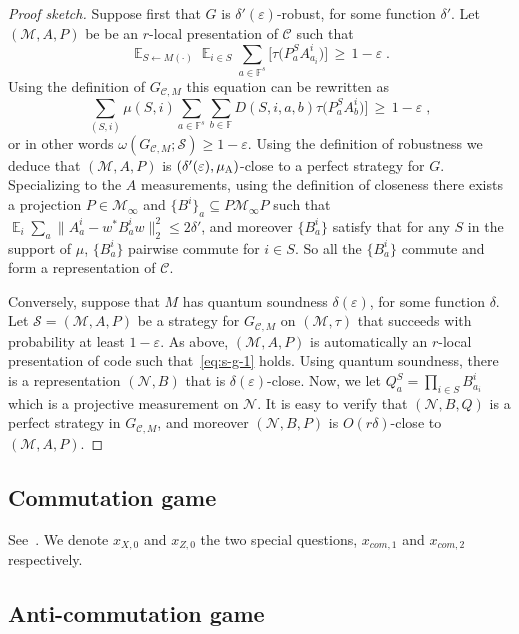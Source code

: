 \documentclass[11pt]{article}
\theoremstyle{definition}
\newcommand{\code}{\mathcal{C}}
\newcommand{\strategy}{\mathscr{S}}
\DeclareMathOperator*{\Expectation}{\mathbb{E}}
\newcommand{\Es}[1]{\Expectation_{#1}}
\newcommand{\field}{\mathbb{F}}
\newcommand{\mM}{\ensuremath{\mathcal{M}}}
\newcommand{\eps}{\varepsilon}
\newcommand{\mN}{\mathcal{N}}
\newcommand{\labelstyle}[1]{\ensuremath{\textsc{#1}}\xspace}
\newcommand{\alice}{\labelstyle{A}}
\begin{document}
\begin{proof}[Proof sketch]
Suppose first that $G$ is $\delta'(\eps)$-robust, for some function $\delta'$. Let $(\mM,A,P)$ be be an $r$-local presentation of $\code$ such that 
\begin{equation}\label{eq:s-g-1}
\Es{S\leftarrow M(\cdot)} \Es{i\in S} \sum_{a\in \field^s} \big[ \tau\big(  P^S_a  A^i_{a_i}\big) \big] \,\geq \,1-\eps\;.
\end{equation}
Using the definition of $G_{\code,M}$ this equation can be rewritten as
\[ \sum_{(S,i)} \mu(S,i) \sum_{a\in \field^s}\sum_{b\in\field} D(S,i,a,b) \tau\big(  P^S_a  A^i_{b}\big) \big] \,\geq \,1-\eps\;,\]
or in other words $\omega(G_{\code,M};\strategy)\geq 1-\eps$. Using the definition of robustness we deduce that $(\mM,A,P)$ is $(\delta'(\eps),\mu_\alice)$-close to a perfect strategy for $G$. Specializing to the $A$ measurements, using the definition of closeness there exists a projection $P\in \mM_\infty$ and $\{B^i\}_a \subseteq P\mM_\infty P$ such that $\Es{i}\sum_a \|A^i_a-w^* B^i_a w \|_2^2 \leq 2\delta'$, and moreover $\{B^i_a\}$ satisfy that for any $S$ in the support of $\mu$, $\{B^i_a\}$ pairwise commute for $i\in S$. So all the $\{B^i_a\}$ commute and form a representation of $\code$. 

Conversely, suppose that $M$ has quantum soundness $\delta(\eps)$, for some function $\delta$.
Let $\strategy=(\mM,A,P)$ be a strategy for $G_{\code,M}$ on $(\mM,\tau)$ that succeeds with probability at least $1-\eps$. As above, $(\mM,A,P)$ is automatically an $r$-local presentation of code such that~\eqref{eq:s-g-1} holds. Using quantum soundness, there is a representation $(\mN,B)$ that is $\delta(\eps)$-close. Now, we let $Q^S_a = \prod_{i\in S} B^i_{a_i}$ which is a projective measurement on $\mN$. It is easy to verify that $(\mN,B,Q)$ is a perfect strategy in $G_{\code,M}$, and moreover $(\mN,B,P)$ is $O(r\delta)$-close to $(\mM,A,P)$.
\end{proof}

\subsection{Commutation game}

See~\cite[Section 3.1]{de2022spectral}. We denote $x_{X,0}$ and $x_{Z,0}$ the two special questions, $x_{com,1}$ and $x_{com,2}$ respectively. 

\subsection{Anti-commutation game}
\end{document}

